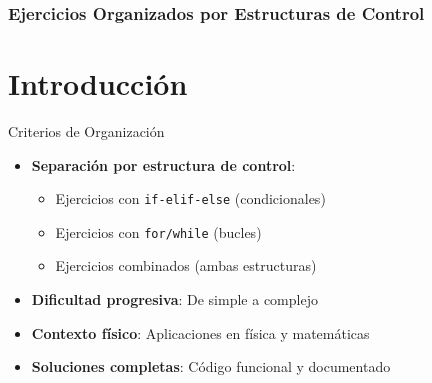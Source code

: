 \documentclass[10pt]{beamer}
\begin{document}
\myfront{}

\begin{frame}[plain]
  \titlepage
\end{frame}

\begin{frame}
  \frametitle{Ejercicios Organizados por Estructuras de Control}
  \tableofcontents
\end{frame}


\section{Introducción}

\begin{frame}{Criterios de Organización}
  \begin{itemize}
    \item \textbf{Separación por estructura de control}:
      \begin{itemize}
        \item Ejercicios con \texttt{if-elif-else} (condicionales)
        \item Ejercicios con \texttt{for/while} (bucles)
        \item Ejercicios combinados (ambas estructuras)
      \end{itemize}
    \item \textbf{Dificultad progresiva}: De simple a complejo
    \item \textbf{Contexto físico}: Aplicaciones en física y matemáticas
    \item \textbf{Soluciones completas}: Código funcional y documentado
  \end{itemize}
\end{frame}
\end{document}
